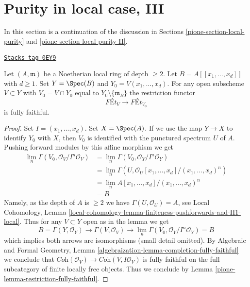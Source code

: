 \section{Purity in local case, III}
\label{pione-section-local-purity-III}
In this section is a continuation of the discussion in
Sections \ref{pione-section-local-purity} and \ref{pione-section-local-purity-II}.

\begin{lemma}
\label{pione-lemma-fully-faithful-power-series-over-depth2}
\href{https://stacks.math.columbia.edu/tag/0EY9}{\texttt{Stacks tag 0EY9}}

Let $(A, \mathfrak m)$ be a Noetherian local ring of depth $\geq 2$.
Let $B = A[[x_1, \ldots, x_d]]$ with $d \geq 1$.
Set $Y = \Spec(B)$ and $Y_0 = V(x_1, \ldots, x_d)$.
For any open subscheme $V \subset Y$ with
$V_0 = V \cap Y_0$ equal to $Y_0 \setminus \{\mathfrak m_B\}$
the restriction functor
$$
\textit{F\'Et}_V \longrightarrow \textit{F\'Et}_{V_0}
$$
is fully faithful.
\end{lemma}

\begin{proof}

Set $I = (x_1, \ldots, x_d)$. Set $X = \Spec(A)$.
If we use the map $Y \to X$ to identify $Y_0$ with $X$,
then $V_0$ is identified with the punctured spectrum $U$ of $A$.
Pushing forward modules by this affine morphism we get
\begin{align*}
\lim_n \Gamma(V_0, \mathcal{O}_V/I^n\mathcal{O}_V)
& =
\lim_n \Gamma(V_0, \mathcal{O}_Y/I^n\mathcal{O}_Y) \\
& =
\lim_n \Gamma(U, \mathcal{O}_U[x_1, \ldots, x_d]/(x_1, \ldots, x_d)^n) \\
& =
\lim_n A[x_1, \ldots, x_d]/(x_1, \ldots, x_d)^n \\
& =
B
\end{align*}
Namely, as the depth of $A$ is $\geq 2$ we have $\Gamma(U, \mathcal{O}_U) = A$,
see Local Cohomology, Lemma
\ref{local-cohomology-lemma-finiteness-pushforwards-and-H1-local}.
Thus for any $V \subset Y$ open as in the lemma we get
$$
B = \Gamma(Y, \mathcal{O}_Y) \to \Gamma(V, \mathcal{O}_V) \to
\lim_n \Gamma(V_0, \mathcal{O}_Y/I^n\mathcal{O}_Y) = B
$$
which implies both arrows are isomorphisms (small detail omitted).
By Algebraic and Formal Geometry, Lemma
\ref{algebraization-lemma-completion-fully-faithful}
we conclude that
$\textit{Coh}(\mathcal{O}_V) \to \textit{Coh}(V, I\mathcal{O}_V)$
is fully faithful on the full subcategory of finite locally free objects.
Thus we conclude by
Lemma \ref{pione-lemma-restriction-fully-faithful}.
\end{proof}

